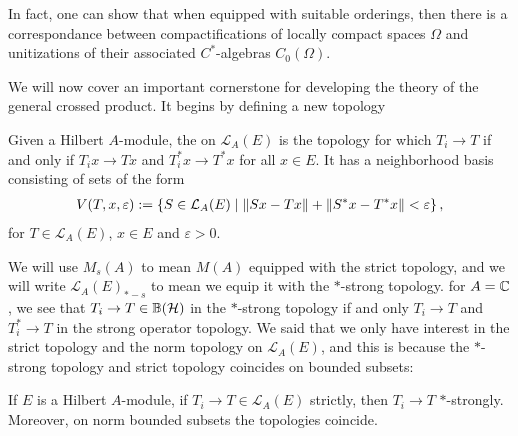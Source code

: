 In fact, one can show that when equipped with suitable orderings, then there is a correspondance between compactifications of locally compact spaces $\Omega$ and unitizations of their associated $C^*$-algebras $C_0(\Omega)$.

We will now cover an important cornerstone for developing the theory of the general crossed product. It begins by defining a new topology
\begin{definition}
	Given a Hilbert $A$-module, the  on $\mathcal{L}_A(E)$ is the topology for which $T_i \to T$ if and only if $T_i x \to Tx$ and $T_i^* x \to T^*x$ for all $x \in E$. It has a neighborhood basis consisting of sets of the form
	\begin{align*}
		V(T,x,\varepsilon) := \left\{ S \in \mathcal{L}_A(E) \mid \left\lVert Sx-Tx\right\rVert + \left\lVert S^*x - T^*x\right\rVert < \varepsilon \right\},
	\end{align*}
	for $T \in \mathcal{L}_A(E)$, $x \in E$ and $ \varepsilon > 0$.
\end{definition}
We will use $M_s(A)$ to mean $M(A)$ equipped with the strict topology, and we will write $\mathcal{L}_A(E)_{*-s}$ to mean we equip it with the $*$-strong topology. for $A=\mathbb{C}$, we see that $T_i \to T \in \mathbb{B}(\mathcal{H})$ in the $*$-strong topology if and only $T_i \to T$ and $T_i^* \to T$ in the strong operator topology. We said that we only have interest in the strict topology and the norm topology on $\mathcal{L}_A(E)$, and this is because the $*$-strong topology and strict topology coincides on bounded subsets:
\begin{proposition}
	If $E$ is a Hilbert $A$-module, if $T_i \to T \in \mathcal{L}_A(E)$ strictly, then $T_i \to T$ $*$-strongly. Moreover, on norm bounded subsets the topologies coincide.
	\label{mult:STARTSTRONG}
\end{proposition}
